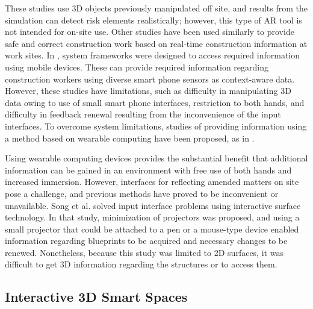 These studies use 3D objects previously manipulated off site, and results from the simulation can detect risk elements realistically; however, this type of AR tool is not intended for on-site use. Other studies have been used similarly to provide safe and correct construction work based on real-time construction information at work sites. In \cite{chen_framework_2011, giretti_design_2009}, system frameworks were designed to access required information using mobile devices. These can provide required information regarding construction workers using diverse smart phone sensors as context-aware data. However, these studies have limitations, such as difficulty in manipulating 3D data owing to use of small smart phone interfaces, restriction to both hands, and difficulty in feedback renewal resulting from the inconvenience of the input interfaces. To overcome system limitations, studies of providing information using a method based on wearable computing have been proposed, as in \cite{behzadan_visualization_2005, yeh_-site_2012}.

Using wearable computing devices provides the substantial benefit that additional information can be gained in an environment with free use of both hands and increased immersion. However, interfaces for reflecting amended matters on site pose a challenge, and previous methods have proved to be inconvenient or unavailable. Song et al. \cite{song_penlight:_2009, song_mouselight:_2010} solved input interface problems using interactive surface technology. In that study, minimization of projectors was proposed, and using a small projector that could be attached to a pen or a mouse-type device enabled information regarding blueprints to be acquired and necessary changes to be renewed. Nonetheless, because this study was limited to 2D surfaces, it was difficult to get 3D information regarding the structures or to access them.



\subsection{Interactive 3D Smart Spaces}


